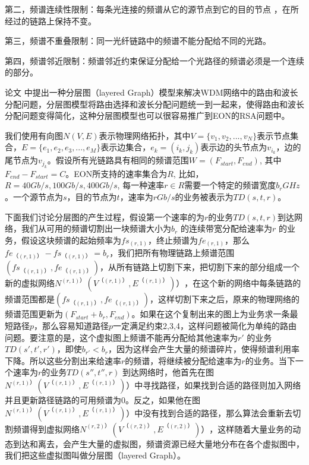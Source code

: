 第二，频谱连续性限制：每条光连接的频谱从它的源节点到它的目的节点 ，在所经过的链路上保持不变。

第三，频谱不重叠限制：同一光纤链路中的频谱不能分配给不同的光路。

第四，频谱邻近限制：频谱邻近约束保证分配给一个光路径的频谱必须是一个连续的部分。

论文 中提出一种分层图（layered Graph）模型来解决WDM网络中的路由和波长分配问题，分层图模型将路由选择和波长分配问题统一到一起来，使得路由和波长分配问题变得简化，这种分层图模型也可以很容易推广到EON的RSA问题中。

我们使用有向图$N(V,E)$表示物理网络拓扑，其中$V=\{v_1,v_2,...,v_N\}$表示节点集合，$E=\{e_1,e_2,e_3,...,e_M\}$表示边集合，$e_k=(i_k,j_k)$表示边的头节点为$v_{i_k}$，边的尾节点为$v_{j_k}$。假设所有光链路具有相同的频谱范围$W=(F_{start},F_{end})$, 其中$F_{end}-F_{start}=C$。EON所支持的速率集合为$R$, 比如，$R={40Gb/s,100Gb/s,400Gb/s}$, 每一种速率$r\in R$需要一个特定的频谱宽度$b_r GHz$。一个源节点为$s$，目的节点为$t$，速率为$r Gb/s$的业务被表示为$TD(s,t,r)$。

下面我们讨论分层图的产生过程，假设第一个速率的为$r$的业务$TD(s,t,r)$到达网络，我们从可用的频谱切割出一块频谱大小为$b_r$ 的连续带宽分配给速率为$r$ 的业务，假设这块频谱的起始频率为$fs_{( r,1 )}$，终止频谱为$fe_{( r,1 )}$，那么$fe_{（ (r,1) ）}-fs_{（ (r,1) ）}=b_r$，我们把所有物理链路上频谱范围$( fs_{（ (r,1) ）},fe_{（ (r,1) ）} )$，从所有链路上切割下来，把切割下来的部分组成一个新的虚拟网络$N^{( r,1) ）} ( V^{（ (r,1) ）},E^{（ (r,1) ）}) ）$，在这个新的网络中每条链路的频谱范围都是$(fs_{（ (r,1) ）},fe_{（ (r,1) ）})$，这样切割下来之后，原来的物理网络的频谱范围更新为$( F_{start}+b_r,F_{end} )$。如果在这个复制出来的图上为业务求一条最短路径$p$，那么容易知道路径$p$一定满足约束2,3,4，这样问题被简化为单纯的路由问题。要注意的是，这个虚拟图上频谱不能再分配给其他速率为$r'$ 的业务$TD(s',t',r')$，即使$b_{r'}<b_r$，因为这样会产生大量的频谱碎片，使得频谱利用率下降。所以这些分割出来给速率$r$的频谱，将继续被分配给速率为$r$的业务。当下一个速率为$r$的业务$TD (s'',t'',r)$ 到达网络时，他首先在图$N^{( r,1) ）} ( V^{（ (r,1) ）},E^{（ (r,1) ）}) ）$中寻找路径，如果找到合适的路径则加入网络并且更新路径链路的可用频谱为0。反之，如果他在图$N^{( r,1) ）} ( V^{（ (r,1) ）},E^{（ (r,1) ）}) ）$中没有找到合适的路径，那么算法会重新去切割频谱得到虚拟网络$N^{( r,2) ）} ( V^{（ (r,2) ）},E^{（ (r,2) ）}) ）$，这样随着大量业务的动态到达和离去，会产生大量的虚拟图，频谱资源已经大量地分布在各个虚拟图中，我们把这些虚拟图叫做分层图（layered Graph）。

